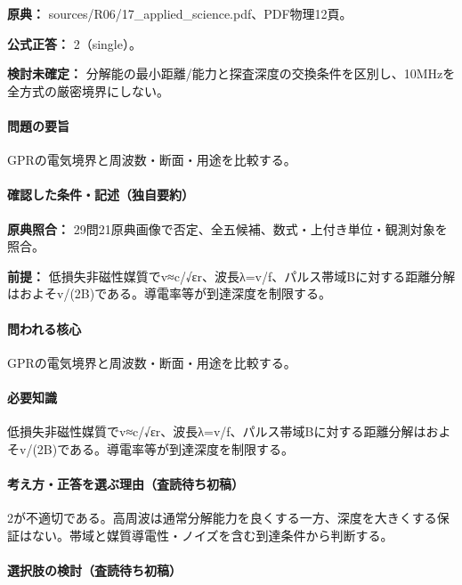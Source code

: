 \noindent\textbf{原典：} sources/R06/17\_applied\_science.pdf、PDF物理12頁。

\textbf{公式正答：} 2（single）。

\par\textbf{検討未確定：} 分解能の最小距離/能力と探査深度の交換条件を区別し、10MHzを全方式の厳密境界にしない。

\paragraph{問題の要旨} GPRの電気境界と周波数・断面・用途を比較する。

\paragraph{確認した条件・記述（独自要約）}\mbox{}\par

\noindent\textbf{原典照合：} 29問21原典画像で否定、全五候補、数式・上付き単位・観測対象を照合。\par

\noindent\textbf{前提：} 低損失非磁性媒質でv≈c/√εr、波長λ=v/f、パルス帯域Bに対する距離分解はおよそv/(2B)である。導電率等が到達深度を制限する。\par

\paragraph{問われる核心} GPRの電気境界と周波数・断面・用途を比較する。

\paragraph{必要知識} 低損失非磁性媒質でv≈c/√εr、波長λ=v/f、パルス帯域Bに対する距離分解はおよそv/(2B)である。導電率等が到達深度を制限する。

\paragraph{考え方・正答を選ぶ理由（査読待ち初稿）} 2が不適切である。高周波は通常分解能力を良くする一方、深度を大きくする保証はない。帯域と媒質導電性・ノイズを含む到達条件から判断する。

\paragraph{選択肢の検討（査読待ち初稿）}\mbox{}\par

